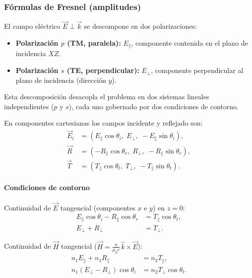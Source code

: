 \documentclass[12pt, a4paper]{article}
\theoremstyle{plain}
\theoremstyle{definition}
\theoremstyle{remark}
\newcommand{\ve}[1]{\vec{#1}}
\newcommand{\uvec}[1]{\hat{#1}}
\begin{document}
\subsubsection{Fórmulas de Fresnel (amplitudes)}

El campo eléctrico $\ve{E} \perp \ve{k}$ se descompone en dos polarizaciones:

\begin{itemize}
  \item \textbf{Polarización $p$ (TM, paralela):} $E_\parallel$, componente
        contenida en el plano de incidencia $XZ$.
  \item \textbf{Polarización $s$ (TE, perpendicular):} $E_\perp$, componente
        perpendicular al plano de incidencia (dirección $y$).
\end{itemize}
Esta descomposición desacopla el problema en dos sistemas lineales
independientes ($p$ y $s$), cada uno gobernado por dos condiciones de contorno.

En componentes cartesianas los campos incidente y reflejado son:
\begin{align*}
  \ve{E}_i &= (E_\parallel\cos\theta_i,\; E_\perp,\; -E_\parallel\sin\theta_i), \\
  \ve{R}   &= (-R_\parallel\cos\theta_r,\; R_\perp,\; -R_\parallel\sin\theta_r), \\
  \ve{T}   &= (T_\parallel\cos\theta_t,\; T_\perp,\; -T_\parallel\sin\theta_t).
\end{align*}

\paragraph{Condiciones de contorno}

Continuidad de $\ve{E}$ tangencial (componentes $x$ e $y$) en $z=0$:
\begin{align}
  E_\parallel\cos\theta_i - R_\parallel\cos\theta_r
    &= T_\parallel\cos\theta_t, \tag{a} \label{cc:Etg_p} \\
  E_\perp + R_\perp &= T_\perp. \tag{b} \label{cc:Etg_s}
\end{align}

Continuidad de $\ve{H}$ tangencial
($\ve{H} = \tfrac{n}{\mu_0 c}\,\uvec{k}\times\ve{E}$):
\begin{align}
  n_1 E_\parallel + n_1 R_\parallel
    &= n_2 T_\parallel, \tag{c} \label{cc:Htg_p} \\
  n_1(E_\perp - R_\perp)\cos\theta_i
    &= n_2 T_\perp\cos\theta_t. \tag{d} \label{cc:Htg_s}
\end{align}
\end{document}

